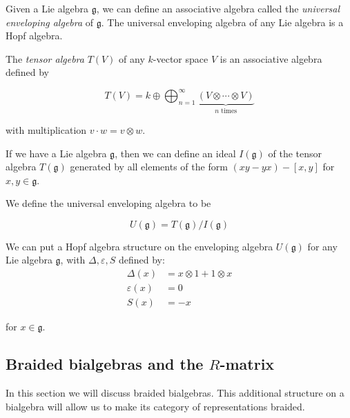 \begin{example}
    \label{UnivEnvAlg}
    Given a Lie algebra $\mathfrak{g}$, we can define an associative algebra
    called the \emph{universal enveloping algebra} of $\mathfrak{g}$. The
    universal enveloping algebra of any Lie algebra is a Hopf algebra.

    The \emph{tensor algebra} $T(V)$ of any $k$-vector space $V$ is an associative
    algebra defined by

    \begin{equation}
        T(V) = k \oplus \bigoplus_{n=1}^\infty \underbrace{(V \otimes \cdots \otimes V)}_{\text{$n$ times}}
    \end{equation}

    with multiplication $v \cdot w = v \otimes w$.


    If we have a Lie algebra $\mathfrak{g}$, then we can define an ideal
    $I(\mathfrak{g})$ of the tensor algebra $T(\mathfrak{g})$ generated by all
    elements of the form $(xy - yx) - \left[ x,y \right]$ for $x,y \in
    \mathfrak{g}$.

    We define the universal enveloping algebra to be 

    \begin{equation}
        U(\mathfrak{g}) = T(\mathfrak{g}) / I(\mathfrak{g})
    \end{equation}

    We can put a Hopf algebra structure on the enveloping algebra
    $U(\mathfrak{g})$ for any Lie algebra $\mathfrak{g}$, with $\Delta,
    \varepsilon, S$ defined by: 
    \begin{align}
        \Delta(x) &= x \otimes 1 + 1 \otimes x \\
        \varepsilon(x) &= 0 \\
        S(x) &= -x  
    \end{align}

    for $x \in \mathfrak{g}$.

\end{example}

\subsection{Braided bialgebras and the $R$-matrix}

In this section we will discuss braided bialgebras. This additional structure
on a bialgebra will allow us to make its category of representations braided.

